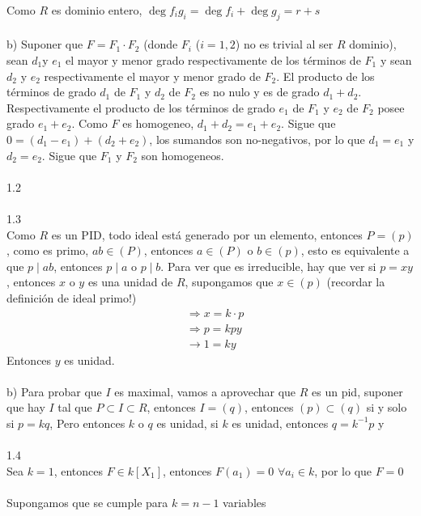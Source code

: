 \documentclass{article}
\begin{document}
Como $R$ es dominio entero, $\deg{f_i g_i}= \deg{f_i} + \deg{g_j}=r+s$
\\
\\
b) Suponer que $F=F_1 \cdot F_2$ (donde $F_i$ ($i=1,2$) no es trivial al ser $R$ dominio), sean $d_1$y $e_1$ el mayor y menor grado respectivamente de los términos de $F_1$ y sean $d_2$ y $e_2$ respectivamente el mayor y menor grado de $F_2$. El producto de los términos de grado $d_1$ de $F_1$ y $d_2$ de $F_2$ es no nulo y es de grado $d_1 + d_2$. Respectivamente el producto de los términos de grado $e_1$ de $F_1$ y $e_2$ de $F_2$ posee grado $e_1 +e_2$. Como $F$ es homogeneo, $d_1 + d_2 = e_1 + e_2$. Sigue que $0=(d_1 - e_1)+ (d_2 + e_2)$, los sumandos son no-negativos, por lo que $d_1=e_1$ y $d_2 = e_2$. Sigue que $F_1$ y $F_2$ son homogeneos.
\\
\\
1.2
\\
\\
1.3
\\
Como $R$ es un PID, todo ideal está generado por un elemento, entonces $P=(p)$, como es primo, $ab \in (P)$, entonces $a \in (P)$ o $b \in (p)$, esto es equivalente a que $p \mid ab$, entonces $p \mid a$ o $p \mid b$. Para ver que es irreducible, hay que ver si $p=xy$, entonces $x$ o $y$ es una unidad de $R$, supongamos que $x \in (p)$ (recordar la definición de ideal primo!)
\begin{equation*}
\begin{aligned}
    &\Longrightarrow x=k \cdot p \\
    &\Longrightarrow p = kpy \\
    &\longrightarrow 1=ky
\end{aligned}
\end{equation*}
Entonces $y$ es unidad.
\\
\\
b) Para probar que $I$ es maximal, vamos a aprovechar que $R$ es un pid, suponer que hay $I$ tal que $P \subset I \subset R$, entonces $I=(q)$, entonces $(p) \subset (q)$ si y solo si $p=kq$, Pero entonces $k$ o $q$ es unidad, si $k$ es unidad, entonces $q=k^{-1}p$ y 
\\
\\
1.4
\\
Sea $k=1$, entonces $F \in k[X_1]$, entonces $F(a_1)=0$ $\forall a_i \in k$, por lo que $F=0$
\\
\\
Supongamos que se cumple para $k=n-1$ variables
\\
\\
\end{document}
